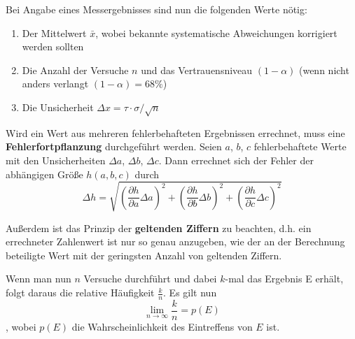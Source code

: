 Bei Angabe eines Messergebnisses sind nun die folgenden Werte nötig:

\begin{enumerate}
  \item Der Mittelwert $\bar{x}$, wobei bekannte systematische Abweichungen korrigiert werden sollten
  \item Die Anzahl der Versuche $n$ und das Vertrauensniveau $(1-\alpha)$ (wenn nicht anders verlangt $(1-\alpha)=68\%$)
  \item Die Unsicherheit $\Delta x=\tau \cdot \sigma / \sqrt{n}$
\end{enumerate}

Wird ein Wert aus mehreren fehlerbehafteten Ergebnissen errechnet, muss eine \textbf{Fehlerfortpflanzung} durchgeführt werden. Seien $a$, $b$, $c$ fehlerbehaftete Werte mit den Unsicherheiten $\Delta a$, $\Delta b$, $\Delta c$. Dann errechnet sich der Fehler der abhängigen Größe $h(a,b,c)$ durch
\begin{equation}
  \Delta h=\sqrt{\left(\frac{\partial h}{\partial a}\Delta a\right)^2+\left(\frac{\partial h}{\partial b}\Delta b\right)^2+\left(\frac{\partial h}{\partial c}\Delta c\right)^2}
  \label{fehlerfortpf}
\end{equation}

Außerdem ist das Prinzip der \textbf{geltenden Ziffern} zu beachten, d.h. ein errechneter Zahlenwert ist nur so genau anzugeben, wie der an der Berechnung beteiligte Wert mit der geringsten Anzahl von geltenden Ziffern.

Wenn man nun $n$ Versuche durchführt und dabei $k$-mal das Ergebnis E erhält, folgt daraus die relative Häufigkeit $\frac{k}{n}$. Es gilt nun
\begin{equation}
  \lim_{n \to \infty} \frac{k}{n}=p(E)
  \label{wahrsch}
\end{equation}
, wobei $p(E)$ die Wahrscheinlichkeit des Eintreffens von $E$ ist.

